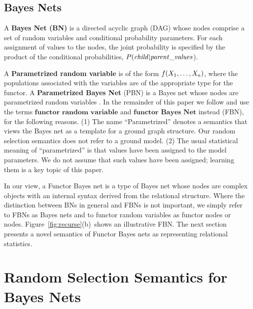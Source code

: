 \documentclass[oribibl]{llncs}
\begin{document}
\subsection{Bayes Nets}

 A {\bf Bayes Net (BN)} is a directed acyclic graph (DAG) whose nodes comprise a set of random variables and conditional probability parameters.
For each assignment of values to the nodes, the joint probability 
is specified by the product of the conditional probabilities, $P(\it{child}|\it{parent\_values}$). 

A \textbf{Parametrized random variable} is of the form $f(X_{1},\ldots,X_{a})$, where the populations associated with the variables are of the appropriate type for the functor. 
%
A \textbf{Parametrized Bayes Net} (PBN) is a Bayes net whose nodes are parametrized random variables \cite{Poole2003}. In the remainder of this paper we follow \cite{Schulte2012} and use the terms $\textbf{functor random variable}$ and $\textbf{functor Bayes Net}$ instead (FBN), for the following reasons. (1) The name ``Parametrized'' denotes a semantics that views the Bayes net as a template for a ground graph structure. Our random selection semantics does not refer to a ground model.  (2) The usual statistical meaning of ``parametrized'' is that values have been assigned to the model parameters. We do not assume that such values have been assigned; learning them is a key topic of this paper. 

In our view, a Functor Bayes net is a type of Bayes net whose nodes are complex objects with an internal syntax derived from the relational structure. Where the distinction between BNs in general and FBNs is not important, we simply refer to FBNs as Bayes nets and to functor random variables as functor nodes or nodes. Figure~\ref{fig:recurse}(b)~shows an illustrative FBN. The next section presents a novel semantics of Functor Bayes nets as representing relational statistics.

\section{Random Selection Semantics for Bayes Nets}
\label{sec:class-level} 

\end{document}
